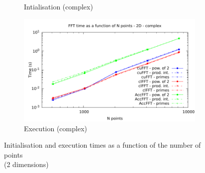 \documentclass[12pt, a4paper]{article}
\begin{document}
\begin{figure}[H]
\begin{subfigure}{.5\textwidth}
\caption{Intialisation (complex)}
\label{FFT2DCI}
\end{subfigure}%
\begin{subfigure}{.5\textwidth}
\centering
\includegraphics[width=.9\linewidth]{graphs/fft-2d-c-exec.pdf}
\caption{Execution (complex)}
\label{FFT2DCE}
\end{subfigure}
\caption{Initialisation and execution times as a function of the number of points\\(2 dimensions)}
\label{FFT1D}
\end{figure}
\end{document}
